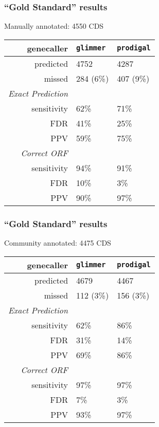 \begin{frame}
  \frametitle{``Gold Standard'' results}
  Manually annotated: 4550 CDS
  \begin{center}
    \begin{tabular}{r|l|l}
	  genecaller & \texttt{glimmer} & \texttt{prodigal}  \\
	  \hline
	  predicted & 4752    & 4287  \\
	  missed & 284 (6\%)   & 407 (9\%)  \\
	  \hline
	  \emph{Exact Prediction} & & \\
  	  sensitivity   & 62\%   & 71\%  \\
  	  FDR   & 41\%   & 25\%  \\  
	  PPV   & 59\% & 75\%  \\  
	  \hline
	  \emph{Correct ORF} & & \\
  	  sensitivity   & 94\%   & 91\% \\
  	  FDR   & 10\%  & 3\% \\  
	  PPV   & 90\% & 97\%  \\  
    \end{tabular}
  \end{center}     
\end{frame}

\begin{frame}
  \frametitle{``Gold Standard'' results}
  Community annotated: 4475 CDS
  \begin{center}
	\begin{tabular}{r|l|l}
	  genecaller & \texttt{glimmer} & \texttt{prodigal}  \\
	  \hline
	  predicted & 4679    & 4467  \\
	  missed & 112 (3\%)   & 156 (3\%)  \\
	  \hline
	  \emph{Exact Prediction} & & \\
  	  sensitivity   & 62\%   & 86\%  \\
  	  FDR   & 31\%   & 14\%  \\  
	  PPV   & 69\% & 86\%  \\  
	  \hline
	  \emph{Correct ORF} & & \\
  	  sensitivity   & 97\%   & 97\% \\
  	  FDR   & 7\%  & 3\% \\  
	  PPV   & 93\% & 97\%  \\  
	\end{tabular}
  \end{center}     
\end{frame}

